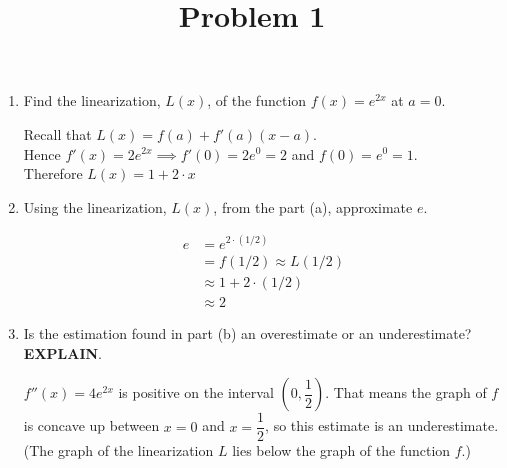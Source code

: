 \documentclass{ximera}
\title[Problem 1]{Problem 1}
\begin{document}
\begin{abstract} \end{abstract}
\maketitle


\begin{problem}




  \begin{enumerate}
    \item
      Find the linearization, $L(x)$, of the function $f(x) = e^{2x}$ at $a = 0$.
      \begin{explanation}
        Recall that $L(x) = f(a) + f'(a)(x - a)$.\\
        Hence  $f'(x) = 2e^{2x} \implies f'(0) = 2e^{0} = 2$  and $ f(0) = e^{0} = 1$.\\
        Therefore $L(x) = 1 + 2\cdot x$
      \end{explanation}

    \item
    Using the linearization, $L(x)$, from the part (a), approximate $e$.
      \begin{explanation}
        \begin{align*}
          e &= e^{2\cdot(1/2)}\\
          &= f(1/2) \approx L(1/2)\\
          &\approx 1 + 2\cdot(1/2)\\
          &\approx 2
        \end{align*}
      \end{explanation}

    \item
    Is the estimation found in part (b) an overestimate or an underestimate? \textbf{EXPLAIN}.
      \begin{explanation}
	$f''(x) = 4e^{2x}$ is positive on the interval $\left(0, \dfrac{1}{2}\right)$. That means the graph of $f$ is concave up between $x=0$ 
	and $x=\dfrac{1}{2}$, so this estimate is an underestimate. (The graph of the linearization $L$ lies below the graph of the function $f$.)
      \end{explanation}
      
  \end{enumerate}
\end{problem}
\end{document}
